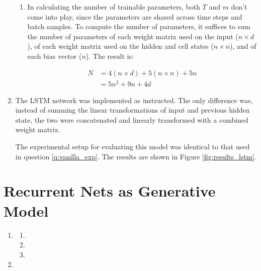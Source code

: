 \documentclass{article}
\begin{document}
\begin{enumerate}[label=\textbf{1.\arabic*}]
\begin{enumerate}[label=\textbf{(\alph*)}]
    \item
    In calculating the number of trainable parameters, both $T$ and $m$ don't come into play, since the parameters are shared across time steps and batch samples. To compute the number of parameters, it suffices to sum the number of parameters of each weight matrix used on the input ($n \times d$), of each weight matrix used on the hidden and cell states ($n \times n$), and of each bias vector ($n$). The result is:

    \begin{align*}
      N &= 4 (n \times d) + 5 (n \times n) + 5 n \\
      &= 5n^2 + 9n + 4d
    \end{align*}

  \end{enumerate}

  \item
  The LSTM network was implemented as instructed. The only difference was, instead of summing the linear transformations of input and previous hidden state, the two were concatenated and linearly transformed with a combined weight matrix.

  The experimental setup for evaluating this model was identical to that used in question \ref{q:vanilla_exp}. The results are shown in Figure \ref{fig:results_lstm}.


\end{enumerate}

\section{Recurrent Nets as Generative Model}

\begin{enumerate}[label=\textbf{2.\arabic*}]
  \item

  \begin{enumerate}[label=\textbf{(\alph*)}]
    \item
    \item
    \item
  \end{enumerate}

  \item
\end{enumerate}

\end{document}
